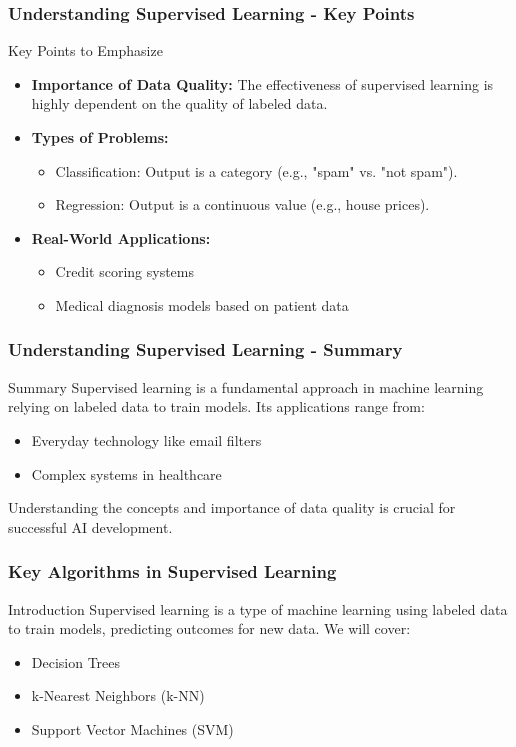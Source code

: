 \documentclass[aspectratio=169]{beamer}
\begin{document}
\begin{frame}[fragile]
    \frametitle{Understanding Supervised Learning - Key Points}
    \begin{block}{Key Points to Emphasize}
        \begin{itemize}
            \item \textbf{Importance of Data Quality:} The effectiveness of supervised learning is highly dependent on the quality of labeled data.
            \item \textbf{Types of Problems:}
            \begin{itemize}
                \item Classification: Output is a category (e.g., "spam" vs. "not spam").
                \item Regression: Output is a continuous value (e.g., house prices).
            \end{itemize}
            \item \textbf{Real-World Applications:}
            \begin{itemize}
                \item Credit scoring systems
                \item Medical diagnosis models based on patient data
            \end{itemize}
        \end{itemize}
    \end{block}
\end{frame}

\begin{frame}[fragile]
    \frametitle{Understanding Supervised Learning - Summary}
    \begin{block}{Summary}
        Supervised learning is a fundamental approach in machine learning relying on labeled data to train models. Its applications range from:
        \begin{itemize}
            \item Everyday technology like email filters
            \item Complex systems in healthcare
        \end{itemize}
        Understanding the concepts and importance of data quality is crucial for successful AI development.
    \end{block}
\end{frame}

\begin{frame}[fragile]
    \frametitle{Key Algorithms in Supervised Learning}
    \begin{block}{Introduction}
        Supervised learning is a type of machine learning using labeled data to train models, predicting outcomes for new data. We will cover:
        \begin{itemize}
            \item Decision Trees
            \item k-Nearest Neighbors (k-NN)
            \item Support Vector Machines (SVM)
        \end{itemize}
    \end{block}
\end{frame}
\end{document}
